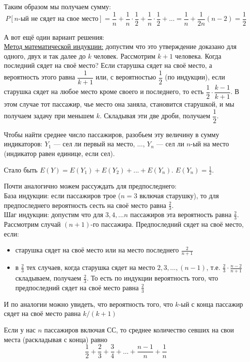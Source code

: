 \documentclass[12pt, a4paper]{article}\usepackage[]{graphicx}\usepackage[]{color}
\begin{document}
\begin{enumerate}
\begin{enumerate}
Таким образом мы получаем сумму:
$$
P[n\text{-ый не сядет на свое место}] = \dfrac{1}{n} + \dfrac{1}{n}\cdot \dfrac{1}{2} + \dfrac{1}{n}\cdot \dfrac{1}{2} + \dots = \dfrac{1}{n}  + \frac{1}{2n}(n-2) = \dfrac{1}{2}
$$
\begin{center}
\end{center}

А вот ещё один вариант решения: \\
\underline{Метод математической индукции:} допустим что это утверждение доказано для одного, двух и так далее до $k$ человек. Рассмотрим $k+1$ человека. Когда последний сядет на своё место? Если старушка сядет на своё место, а вероятность этого равна $\dfrac{1}{k+1}$ или, с вероятностью $\dfrac{1}{2}$ (по индукции), если старушка сядет на любое место кроме своего и последнего, то есть $\dfrac{1}{2}\cdot\dfrac{k-1}{k+1}$. В этом случае тот\vspace{0.2cm} пассажир, чье место  она заняла, становится старушкой, и мы получаем задачу при меньшем $k$. Складывая эти две дроби, получаем $\dfrac{1}{2} $.

Чтобы найти среднее число пассажиров, разобьем эту величину в сумму индикаторов: $Y_1$ — сел ли первый на место, $\dots$, $Y_n$ — сел ли $n$-ый на место (индикатор равен единице, если сел).

Стало быть $E(Y)=E(Y_1)+E(Y_2)+...+E(Y_n)$. $E(Y_n)=\frac{1}{2}$.

Почти аналогично можем рассуждать для предпоследнего:\\
База индукции: если пассажиров трое ($n=3$ включая старушку), то для предпоследнего вероятность сесть на своё место равна $\frac{2}{3}$.\\
Шаг индукции: допустим что для $3, 4, ... n$ пассажиров эта вероятность равна $\frac{2}{3}$.
Рассмотрим случай $(n+1)$-го пассажира.
Предпоследний сядет на своё место, если:

\renewcommand{\labelitemi}{\textbullet}

\begin{itemize}
\item старушка сядет на своё место или на место последнего $\frac{2}{n+1}$
\item в $\frac{2}{3}$ тех случаев, когда старушка сядет на место $2, 3, ..., (n-1)$, т.е. $\frac{2}{3}\cdot \frac{n-2}{n+1}$
складываем, получаем $\frac{2}{3}$.
То есть по индукции вероятность того, что предпоследний сядет на своё место равна $\frac{2}{3}$
\end{itemize}
И по аналогии можно увидеть, что вероятность того, что $k$-ый с конца пассажир сядет на своё место равна $k/(k+1)$

Если у нас $n$ пассажиров включая СС, то среднее количество севших на свои места (раскладывая с конца) равно $$\frac{1}{2}+\frac{2}{3}+\frac{3}{4}+\dots+\frac{n-1}{n}+\frac{1}{n}$$

\end{enumerate}

\end{enumerate}
\end{document}
